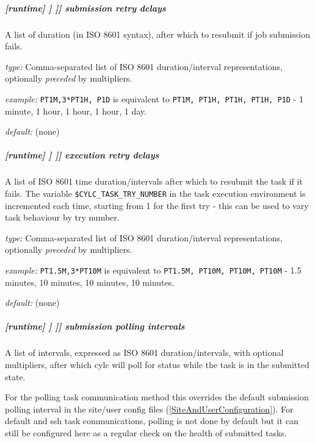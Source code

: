 \subparagraph[submission retry delays]{[runtime] \textrightarrow [[\_\_NAME\_\_]] \textrightarrow [[[job]]] \textrightarrow submission retry delays}
\label{JobSubRefRetries}

A list of duration (in ISO 8601 syntax), after which to resubmit if job
submission fails.
\begin{myitemize}
    \item {\em type:} Comma-separated list of ISO 8601 duration/interval
        representations, optionally {\em preceded} by multipliers.
    \item {\em example:} \lstinline=PT1M,3*PT1H, P1D= is equivalent to
    \lstinline=PT1M, PT1H, PT1H, PT1H, P1D= - 1 minute, 1 hour, 1 hour, 1
    hour, 1 day.
    \item {\em default:} (none)
\end{myitemize}

\subparagraph[execution retry delays]{[runtime] \textrightarrow [[\_\_NAME\_\_]] \textrightarrow [[[job]]] \textrightarrow execution retry delays}
\label{RefRetries}

A list of ISO 8601 time duration/intervals after which to resubmit the task
if it fails. The variable \lstinline=$CYLC_TASK_TRY_NUMBER= in the task
execution environment is incremented each time, starting from 1 for the
first try - this can be used to vary task behaviour by try number.

\begin{myitemize}
    \item {\em type:} Comma-separated list of ISO 8601 duration/interval representations,
    optionally {\em preceded} by multipliers.
    \item {\em example:} \lstinline=PT1.5M,3*PT10M= is equivalent to
    \lstinline=PT1.5M, PT10M, PT10M, PT10M= - 1.5 minutes, 10 minutes,
    10 minutes, 10 minutes.
    \item {\em default:} (none)
\end{myitemize}

\subparagraph[submission polling intervals]{[runtime] \textrightarrow [[\_\_NAME\_\_]] \textrightarrow [[[job]]] \textrightarrow submission polling intervals}
\label{SubmissionPollingIntervals}

A list of intervals, expressed as ISO 8601 duration/intervals, with optional
multipliers, after which cylc will poll for status while the task is in the
submitted state.

For the polling task communication method this overrides the default
submission polling interval in the site/user config files
(\ref{SiteAndUserConfiguration}). For default and ssh task communications,
polling is not done by default but it can still be configured here as a
regular check on the health of submitted tasks.

